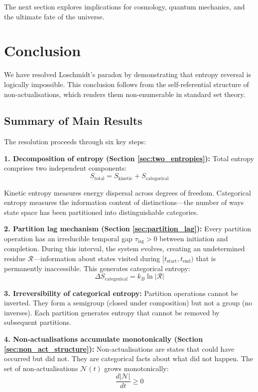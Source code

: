 \documentclass[twocolumn,10pt]{article}
\theoremstyle{definition}
\theoremstyle{remark}
\begin{document}
The next section explores implications for cosmology, quantum mechanics, and the ultimate fate of the universe.

\section{Conclusion}
\label{sec:conclusion}

We have resolved Loschmidt's paradox by demonstrating that entropy reversal is logically impossible. This conclusion follows from the self-referential structure of non-actualisations, which renders them non-enumerable in standard set theory.

\subsection{Summary of Main Results}

The resolution proceeds through six key steps:

\textbf{1. Decomposition of entropy (Section \ref{sec:two_entropies}):} Total entropy comprises two independent components:
$$
S_{\text{total}} = S_{\text{kinetic}} + S_{\text{categorical}}
$$

Kinetic entropy measures energy dispersal across degrees of freedom. Categorical entropy measures the information content of distinctions—the number of ways state space has been partitioned into distinguishable categories.

\textbf{2. Partition lag mechanism (Section \ref{sec:partition_lag}):} Every partition operation has an irreducible temporal gap $\tau_{\text{lag}} > 0$ between initiation and completion. During this interval, the system evolves, creating an undetermined residue $\mathcal{R}$—information about states visited during $[t_{\text{start}}, t_{\text{end}})$ that is permanently inaccessible. This generates categorical entropy:
$$
\Delta S_{\text{categorical}} = k_B \ln|\mathcal{R}|
$$

\textbf{3. Irreversibility of categorical entropy:} Partition operations cannot be inverted. They form a semigroup (closed under composition) but not a group (no inverses). Each partition generates entropy that cannot be removed by subsequent partitions.

\textbf{4. Non-actualisations accumulate monotonically (Section \ref{sec:non_act_structure}):} Non-actualisations are states that could have occurred but did not. They are categorical facts about what did not happen. The set of non-actualisations $\mathcal{N}(t)$ grows monotonically:
$$
\frac{d|\mathcal{N}|}{dt} \geq 0
$$
\end{document}
